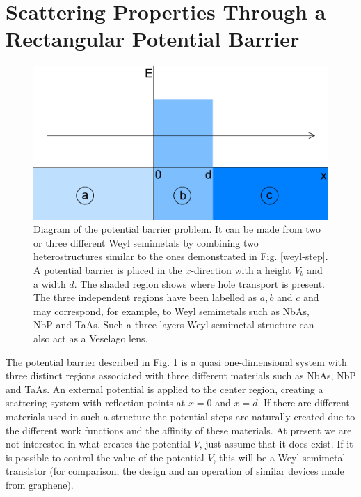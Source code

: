 \documentclass[prb,twocolumn,aps,superscriptaddress,showpacs,floatfix]{revtex4}
\begin{document}

\section{Scattering Properties Through a Rectangular Potential Barrier}
\begin{figure}
	\centerline{\includegraphics[scale=0.2]{weyl-symmetrical-flat}}
	\caption{Diagram of the potential barrier problem. It can be made from two or three different Weyl semimetals by combining two heterostructures similar to the ones demonstrated in Fig. \ref{weyl-step}. A potential barrier is placed in the $x$-direction with a height $V_{b}$ and a width $d$. The shaded region shows where hole transport is present. The three independent regions have been labelled as $a,b$ and $c$ and may correspond, for example, to Weyl semimetals such as NbAs, NbP and TaAs. Such a three layers Weyl semimetal structure can also act as a Veselago lens.}
	\label{weyl-symmetrical-flat}
\end{figure}
	The potential barrier described in Fig. \ref{weyl-symmetrical-flat} is a quasi one-dimensional system with three distinct regions associated with three different materials such as NbAs, NbP and TaAs. An external potential is applied to the center region, creating a scattering system with reflection points at $x=0$ and $x=d$.  If there are different materials used in such a structure the potential steps are naturally created due to the different work functions and the affinity of these materials. At present we are not interested in what creates the potential $V$, just assume that it does exist. If it is possible to control the value of the potential $V$, this will be a Weyl semimetal transistor (for comparison, the design and an operation of similar devices made from graphene\cite{Stone,Hartmann}).
\end{document}
